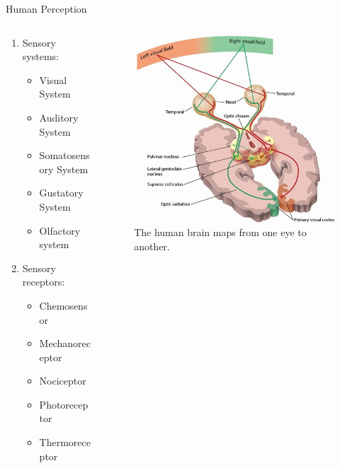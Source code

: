 \documentclass{beamer}
\newcommand\Fontsmall{\fontsize{6}{5}\selectfont}
\begin{document}
\begin{frame}{Human Perception}
    \begin{columns}[T]
        \begin{column}{.5\textwidth}
        \begin{enumerate}
            \item{Sensory systems:}
            \begin{itemize}
                \item{Visual System}
                \item{Auditory System}
                \item{Somatosensory System}
                \item{Gustatory System}
                \item{Olfactory system}
            \end{itemize}
            \item{Sensory receptors:}
            \begin{itemize}
                \item{Chemosensor}
                \item{Mechanoreceptor}
                \item{Nociceptor}
                \item{Photoreceptor}
                \item{Thermoreceptor}
            \end{itemize}
        \end{enumerate}
        \end{column}
        \begin{column}{.5\textwidth}
            \begin{figure}
                \includegraphics[width=.7\textwidth]{Images/eyes.jpg}
                \caption{The human brain maps from one eye to another. \Fontsmall{Image: Copyright Wikipedia.}}
            \end{figure}
        \end{column}
  \end{columns} 
\end{frame}
\end{document}
